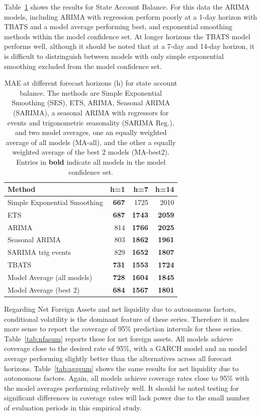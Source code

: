 \documentclass{article}
\begin{document}
Table~\ref{tab:sabsum} shows the results for State Account Balance. For this data the ARIMA models, including ARIMA with regression perform poorly at a 1-day horizon with TBATS and a model average performing best, and exponential smoothing methods within the model confidence set. At longer horizons the TBATS model performs well, although it should be noted that at a 7-day and 14-day horizon, it is difficult to distringuish between models with only simple exponential smoothing excluded from the model confidence set.

\begin{table}[!ht]
\centering
\begin{tabular}{lrrr}
  \hline
Method & h=1 & h=7 & h=14 \\ 
  \hline
Simple Exponential Smoothing & \textbf{667} & 1725 & 2010 \\ 
  ETS & \textbf{687} & \textbf{1743} & \textbf{2059} \\ 
  ARIMA & 814 & \textbf{1766} & \textbf{2025} \\ 
  Seasonal ARIMA & 803 & \textbf{1862} & \textbf{1961} \\ 
  SARIMA trig events & 829 & \textbf{1652} & \textbf{1807} \\ 
  TBATS & \textbf{731} & \textbf{1553} & \textbf{1724 }\\ 
  Model Average (all models) & \textbf{728} & \textbf{1604} & \textbf{1845} \\ 
  Model Average (best 2) & \textbf{684} & \textbf{1567} & \textbf{1801} \\ 
   \hline
\end{tabular}
\caption{MAE at different forecast horizons (h) for state account balance. The methods are Simple Exponential Smoothing (SES), ETS, ARIMA, Seasonal ARIMA (SARIMA), a seasonal ARIMA with regressors for events and trigonometric seasonality (SARIMA Reg.), and two model averages, one an equally weighted average of all models (MA-all), and the other a equally weighted average of the best 2 models (MA-best2). Entries in \textbf{bold} indicate all models in the model confidence set.} 
\label{tab:sabsum}
\end{table}

Regarding Net Foreign Assets and net liquidity due to autonomous factors, conditional volatility is the dominant feature of these series. Therefore it makes more sense to report the coverage of 95\% prediction intervals for these series. Table~\ref{tab:nfasum} reports these for net foreign assets. All models achieve coverage close to the desired rate of 95\%, with a GARCH model and an model average performing slightly better than the alternatives across all forecast horizons. Table~\ref{tab:aggsum} shows the same results for net liquidity due to autonomous factors. Again, all models achieve coverage rates close to 95\% with the model averages performing relatively well. It should be noted testing for significant differences in coverage rates will lack power due to the small number of evaluation periods in this empirical study.
\end{document}
